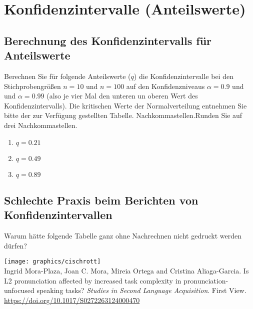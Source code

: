 \section{Konfidenzintervalle (Anteilswerte)}

\subsection{Berechnung des Konfidenzintervalls für Anteilswerte}

Berechnen Sie für folgende Anteilswerte ($q$) die Konfidenzintervalle bei den Stichprobengrößen $n=10$ und $n=100$ auf den Konfidenzniveaus $\alpha=0.9$ und und $\alpha=0.99$ (also je vier Mal den unteren un oberen Wert des Konfidenzintervalls).
Die kritischen Werte der Normalverteilung entnehmen Sie bitte der zur Verfügung gestellten Tabelle.
 Nachkommastellen.Runden Sie auf drei Nachkommastellen.

\begin{enumerate}
  \item $q=0.21$ 
  \item $q=0.49$
  \item $q=0.89$
\end{enumerate}



\subsection{Schlechte Praxis beim Berichten von Konfidenzintervallen}

Warum hätte folgende Tabelle ganz ohne Nachrechnen nicht gedruckt werden dürfen?

\begin{center}
  \texttt{[image: graphics/cischrott]}\\
  \Zeile
  Ingrid Mora-Plaza, Joan C. Mora, Mireia Ortega and Cristina Aliaga-Garcia. Is L2 pronunciation affected by increased task complexity in pronunciation-unfocused speaking tasks? \textit{Studies in Second Language Acquisition}. First View. \url{https://doi.org/10.1017/S0272263124000470}
  \grau{\tiny }

\end{center}
